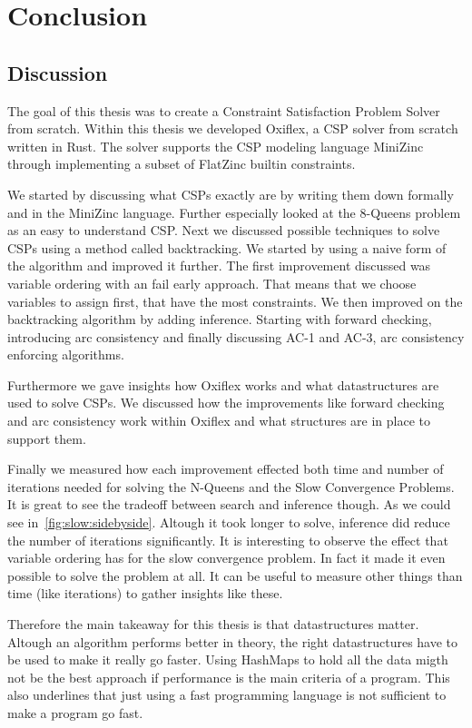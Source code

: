 
\chapter{Conclusion} \label{chap:conclusion}

\section{Discussion}

The goal of this thesis was to create a Constraint Satisfaction Problem Solver from scratch. Within this thesis we developed Oxiflex, a CSP solver from scratch written in Rust. The solver supports the CSP modeling language MiniZinc through implementing a subset of FlatZinc builtin constraints.

We started by discussing what CSPs exactly are by writing them down formally and in the MiniZinc language. Further especially looked at the 8-Queens problem as an easy to understand CSP. Next we discussed possible techniques to solve CSPs using a method called backtracking. We started by using a naive form of the algorithm and improved it further. The first improvement discussed was variable ordering with an fail early approach. That means that we choose variables to assign first, that have the most constraints. We then improved on the backtracking algorithm by adding inference. Starting with forward checking, introducing arc consistency and finally discussing AC-1 and AC-3, arc consistency enforcing algorithms.

Furthermore we gave insights how Oxiflex works and what datastructures are used to solve CSPs. We discussed how the improvements like forward checking and arc consistency work within Oxiflex and what structures are in place to support them.

Finally we measured how each improvement effected both time and number of iterations needed for solving the N-Queens and the Slow Convergence Problems. It is great to see the tradeoff between search and inference though. As we could see in~\cref{fig:slow:sidebyside}. Altough it took longer to solve, inference did reduce the number of iterations significantly. It is interesting to observe the effect that variable ordering has for the slow convergence problem. In fact it made it even possible to solve the problem at all. It can be useful to measure other things than time (like iterations) to gather insights like these.

Therefore the main takeaway for this thesis is that datastructures matter. Altough an algorithm performs better in theory, the right datastructures have to be used to make it really go faster. Using HashMaps to hold all the data migth not be the best approach if performance is the main criteria of a program. This also underlines that just using a fast programming language is not sufficient to make a program go fast.

